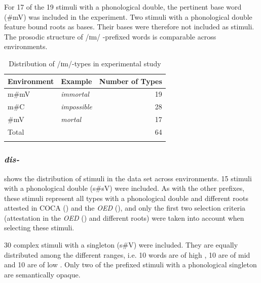 For 17 of the 19 stimuli with a phonological double, the pertinent base word ({\#mV}) was included in the experiment. Two stimuli with a phonological double feature bound roots as bases. Their bases were therefore not included as stimuli. The prosodic structure of /ɪm/ -prefixed words is comparable across environments.



\begin{table}

	\caption{Distribution of /ɪm/-types in experimental study}
	\label{tbl:distribution of im types in experiment}

	
		\begin{tabular} {llr}
\lsptoprule

Environment &Example &Number of   Types\\

 \midrule
 m\#mV&\textit{immortal} & 19  \\
  m\#C&\textit{impossible} & 28 \\
  \#mV&\textit{mortal} & 17 \\
 \midrule
 Total& & 64\\
 \lspbottomrule                                                                                
		\end{tabular}
	
\end{table}



\subsubsection{\textit{dis-}} \label{dis stimui}

 shows the distribution of  stimuli in the data set across environments. 
15  stimuli with a phonological double (s\#sV) were included. As with the other prefixes, these stimuli represent all types with a phonological double and different roots attested in  {COCA} (\citealt{Davies.20082014}) and the \textit{OED} (\citealt{OED.2013}),  and only the first two selection criteria (attestation in the \textit{OED} (\citealt{OED.2013}) and different roots) were taken into account when selecting these stimuli. 

30 complex stimuli with a singleton (s\#V) were included. They are equally distributed among the different  ranges, i.e. 10 words are of high , 10 are of mid  and 10 are of low . 
Only two of the prefixed stimuli with a phonological singleton are semantically opaque. 


